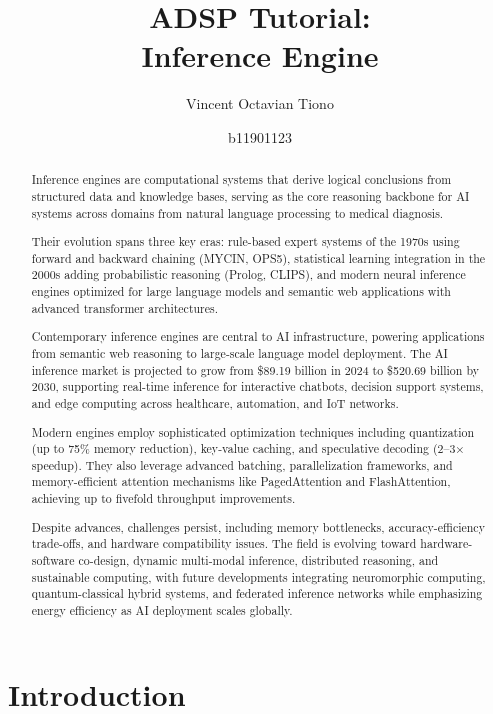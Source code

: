 \documentclass[12pt,a4paper]{article}
\title{\bf ADSP Tutorial: \\Inference Engine}
\author{Vincent Octavian Tiono}
\date{b11901123}
\begin{document}
\maketitle

\begin{abstract}
Inference engines are computational systems that derive logical conclusions from structured data and knowledge bases, serving as the core reasoning backbone for AI systems across domains from natural language processing to medical diagnosis.

Their evolution spans three key eras: rule-based expert systems of the 1970s using forward and backward chaining (MYCIN, OPS5), statistical learning integration in the 2000s adding probabilistic reasoning (Prolog, CLIPS), and modern neural inference engines optimized for large language models and semantic web applications with advanced transformer architectures.

Contemporary inference engines are central to AI infrastructure, powering applications from semantic web reasoning to large-scale language model deployment. The AI inference market is projected to grow from \$89.19 billion in 2024 to \$520.69 billion by 2030, supporting real-time inference for interactive chatbots, decision support systems, and edge computing across healthcare, automation, and IoT networks.

Modern engines employ sophisticated optimization techniques including quantization (up to 75\% memory reduction), key-value caching, and speculative decoding (2–3× speedup). They also leverage advanced batching, parallelization frameworks, and memory-efficient attention mechanisms like PagedAttention and FlashAttention, achieving up to fivefold throughput improvements.

Despite advances, challenges persist, including memory bottlenecks, accuracy-efficiency trade-offs, and hardware compatibility issues. The field is evolving toward hardware-software co-design, dynamic multi-modal inference, distributed reasoning, and sustainable computing, with future developments integrating neuromorphic computing, quantum-classical hybrid systems, and federated inference networks while emphasizing energy efficiency as AI deployment scales globally.
\end{abstract}

\newpage
\tableofcontents
\newpage

\section{Introduction}
\end{document}
